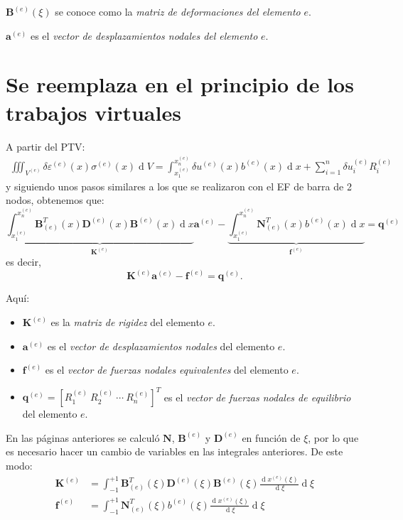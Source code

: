 \documentclass[12pt,letterpaper]{article}
\newcommand{\ve}[1]{{\boldsymbol{#1}}}
\newcommand{\ma}[1]{{\boldsymbol{#1}}}
\newcommand{\dd}{\operatorname{d} \!}
\begin{document}
$\ma{B}^{(e)}(\xi)$ se conoce como la \emph{matriz de deformaciones del elemento} $e$.

$\ve{a}^{(e)}$ es el \emph{vector de desplazamientos nodales del elemento} $e$.

\newpage
\section{Se reemplaza en el principio de los trabajos virtuales}

A partir del PTV:
\begin{align}
\iiint_{V^{(e)}} \delta\varepsilon^{(e)}(x) \sigma^{(e)}(x) \dd V = \int_{x_1^{(e)}}^{x_n^{(e)}} \delta u^{(e)}(x) b^{(e)}(x) \dd x + \sum_{i=1}^n \delta u_i^{(e)} R_i^{(e)}
\end{align}
y siguiendo unos pasos similares a los que se realizaron con el EF de barra de 2 nodos, obtenemos que:
\begin{equation}
\underbrace{\int_{x_1^{(e)}}^{x_n^{(e)}} \ma{B}_{(e)}^T(x) \ma{D}^{(e)}(x) \ma{B}^{(e)}(x) \dd x}_{\ma{K}^{(e)}} \ve{a}^{(e)} 
- \underbrace{\int_{x_1^{(e)}}^{x_n^{(e)}}  \ma{N}_{(e)}^T(x) b^{(e)}(x) \dd x}_{\ma{f}^{(e)}} 
= \ma{q}^{(e)}
\end{equation}
es decir,
\begin{equation}
\ma{K}^{(e)} \ve{a}^{(e)} - \ma{f}^{(e)} = \ma{q}^{(e)}.
\end{equation}

Aquí:
\begin{itemize}
    \item $\ma{K}^{(e)}$ es la \emph{matriz de rigidez} del elemento $e$.
    \item $\ve{a}^{(e)}$ es el \emph{vector de desplazamientos nodales} del elemento $e$.
    \item $\ma{f}^{(e)}$ es el \emph{vector de fuerzas nodales equivalentes} del elemento $e$.    
    \item $\ve{q}^{(e)} = [R_1^{(e)}\ R_2^{(e)}\ \cdots \ R_n^{(e)}]^T$ es el \emph{vector de fuerzas nodales de equilibrio} del elemento $e$.
\end{itemize}

En las páginas anteriores se calculó $\ma{N}$, $\ma{B}^{(e)}$ y $\ma{D}^{(e)}$ en función de $\xi$, por lo que es necesario hacer un cambio de variables en las integrales anteriores. De este modo:
\begin{align}
\ma{K}^{(e)} &= \int_{-1}^{+1} \ma{B}_{(e)}^T(\xi) \ma{D}^{(e)}(\xi) \ma{B}^{(e)}(\xi) \frac{\dd x^{(e)}(\xi)}{\dd \xi} \dd \xi\\
\ma{f}^{(e)} &= \int_{-1}^{+1}  \ma{N}_{(e)}^T(\xi) b^{(e)}(\xi) \frac{\dd x^{(e)}(\xi)}{\dd \xi} \dd \xi
\end{align}
\end{document}

